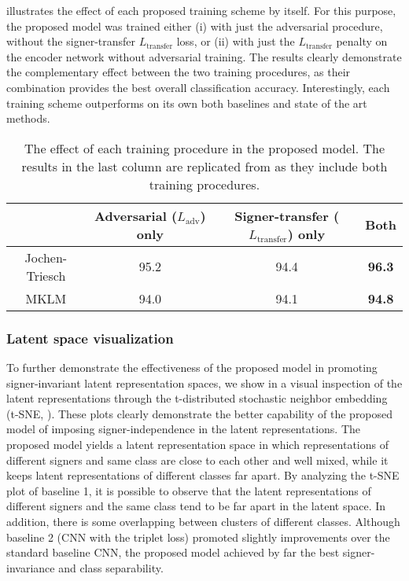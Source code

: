  illustrates the effect of each proposed training scheme by itself. For this purpose, the proposed model was trained either (i) with just the adversarial procedure, without the signer-transfer $L_{\text{transfer}}$ loss, or (ii) with just the $L_{\text{transfer}}$ penalty on the encoder network without adversarial training. The results clearly demonstrate the complementary effect between the two training procedures, as their combination provides the best overall classification accuracy. Interestingly, each training scheme outperforms on its own both baselines and state of the art methods.

\begin{table}[t]
    \centering
    \begin{small}
        \begin{tabular}{c|c c : c }
            & Adversarial ($L_{\text{adv}}$) only  & Signer-transfer ($L_{\text{transfer}}$) only & Both \\ \hline
            Jochen-Triesch                              & 95.2            & 94.4                & \textbf{96.3}        \\
            MKLM            & 94.0            & 94.1                & \textbf{94.8}
        \end{tabular}
    \end{small}
    \caption{\centering The effect of each training procedure in the proposed model. The results in the last column are replicated from  as they include both training procedures.}
    \label{tab:loss_terms}
\end{table}

\subsubsection{Latent space visualization}
\label{sec:adv_signer_inv_tsne}
To further demonstrate the effectiveness of the proposed model in promoting signer-invariant latent representation spaces, we show in  a visual inspection of the latent representations through the t-distributed stochastic neighbor embedding (t-SNE, \citet{Maaten2008}). These plots clearly demonstrate the better capability of the proposed model of imposing signer-independence in the latent representations. The proposed model yields a latent representation space in which representations of different signers and same class are close to each other and well mixed, while it keeps latent representations of different classes far apart. By analyzing the t-SNE plot of baseline 1, it is possible to observe that the latent representations of different signers and the same class tend to be far apart in the latent space. In addition, there is some overlapping between clusters of different classes. Although baseline 2 (CNN with the triplet loss) promoted slightly improvements over the standard baseline CNN, the proposed model achieved by far the best signer-invariance and class separability.

